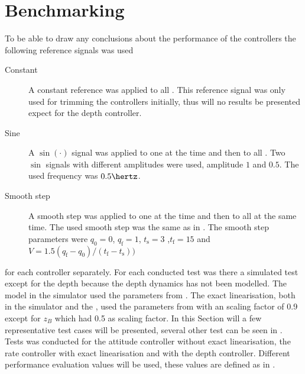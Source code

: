 \section{Benchmarking}
To be able to draw any conclusions about the performance of the controllers the following reference signals was used
\begin{description}
\item[Constant] A constant reference was applied to all \abbrDOF. This reference signal was only used for trimming the controllers initially, thus will no results be presented expect for the depth controller.

\item[Sine] A $\sin(\cdot)$ signal was applied to one \abbrDOF at the time and then to all \abbrDOF. Two $\sin$ signals with different amplitudes were used, amplitude $1$ and $0.5$. The used frequency was $0.5 \hertz$.

\item[Smooth step] A smooth step was applied to one \abbrDOF at the time and then to all \abbrDOF at the same time. The used smooth step was the same as in \citet[p. 192-195]{robotics}. The smooth step parameters were $q_{\text{0}} = 0$, $q_{\text{f}} = 1$, $t_{\text{s}} = 3$ ,$t_{\text{f}} = 15$ and $V = 1.5 (q_{\text{f}} - q_{\text{0}})/(t_{\text{f}} - t_{\text{s}}))$
\end{description}
for each controller separately. For each conducted test was there a simulated test except for the depth because the depth dynamics has not been modelled. The \abbrROV model in the simulator used the parameters from . The exact linearisation, both in the simulator and the \abbrROV, used the parameters from  with an scaling factor of 0.9 except for $z_B$ which had 0.5 as scaling factor. In this Section will a few representative test cases will be presented,  several other test can be seen in . Tests was conducted for the \abbrPID attitude controller without exact linearisation, the \abbrPI rate controller with exact linearisation and with the \abbrPI depth controller. Different performance evaluation values will be used, these values are defined as in \citet{reglerteori}. 

